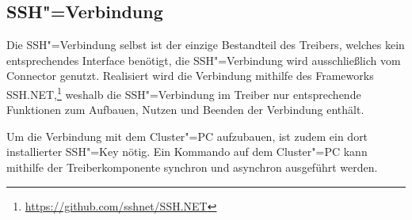 \subsection{SSH"=Verbindung}
\label{subsec:sshConnection}

Die SSH"=Verbindung selbst ist der einzige Bestandteil des Treibers, welches kein entsprechendes Interface benötigt, die SSH"=Verbindung wird ausschließlich vom Connector genutzt.
Realisiert wird die Verbindung mithilfe des Frameworks SSH.NET,\footnote{\url{https://github.com/sshnet/SSH.NET}} weshalb die SSH"=Verbindung im Treiber nur entsprechende Funktionen zum Aufbauen, Nutzen und Beenden der Verbindung enthält.

Um die Verbindung mit dem Cluster"=PC aufzubauen, ist zudem ein dort installierter SSH"=Key nötig.
Ein Kommando auf dem Cluster"=PC kann mithilfe der Treiberkomponente synchron und asynchron ausgeführt werden.
